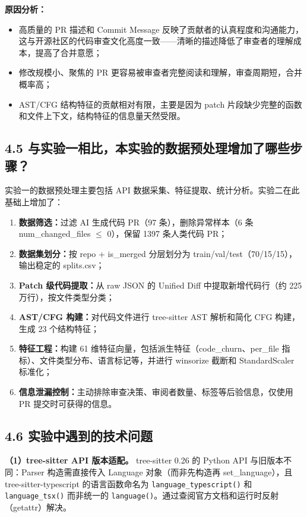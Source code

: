 \documentclass{experimentreport}
\begin{document}
{\textbf{原因分析：}
\begin{itemize}
    \item 高质量的 PR 描述和 Commit Message 反映了贡献者的认真程度和沟通能力，这与开源社区的代码审查文化高度一致——清晰的描述降低了审查者的理解成本，提高了合并意愿；
    \item 修改规模小、聚焦的 PR 更容易被审查者完整阅读和理解，审查周期短，合并概率高；
    \item AST/CFG 结构特征的贡献相对有限，主要是因为 patch 片段缺少完整的函数和文件上下文，结构特征的信息量天然受限。
\end{itemize}

\subsection*{4.5 与实验一相比，本实验的数据预处理增加了哪些步骤？}

实验一的数据预处理主要包括 API 数据采集、特征提取、统计分析。实验二在此基础上增加了：

\begin{enumerate}
    \item \textbf{数据筛选：}过滤 AI 生成代码 PR（97 条），删除异常样本（6 条 num\_changed\_files $\le$ 0），保留 1397 条人类代码 PR；
    \item \textbf{数据集划分：}按 repo + is\_merged 分层划分为 train/val/test（70/15/15），输出稳定的 splits.csv；
    \item \textbf{Patch 级代码提取：}从 raw JSON 的 Unified Diff 中提取新增代码行（约 225 万行），按文件类型分类；
    \item \textbf{AST/CFG 构建：}对代码文件进行 tree-sitter AST 解析和简化 CFG 构建，生成 23 个结构特征；
    \item \textbf{特征工程：}构建 61 维特征向量，包括派生特征（code\_churn、per\_file 指标）、文件类型分布、语言标记等，并进行 winsorize 截断和 StandardScaler 标准化；
    \item \textbf{信息泄漏控制：}主动排除审查决策、审阅者数量、标签等后验信息，仅使用 PR 提交时可获得的信息。
\end{enumerate}

\subsection*{4.6 实验中遇到的技术问题}

\textbf{（1）tree-sitter API 版本适配。} tree-sitter 0.26 的 Python API 与旧版本不同：Parser 构造需直接传入 Language 对象（而非先构造再 set\_language），且 tree-sitter-typescript 的语言函数命名为 \texttt{language\_typescript()} 和 \texttt{language\_tsx()} 而非统一的 \texttt{language()}。通过查阅官方文档和运行时反射（getattr）解决。

}
\end{document}
